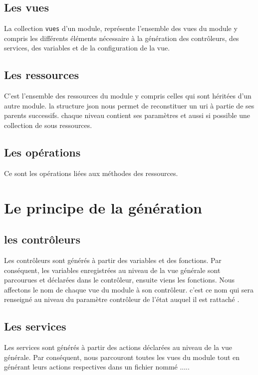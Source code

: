 \documentclass[a4paper,11pt]{report}
\begin{document}
\subsection{Les vues}
La collection {\tt vues} d'un module, représente l'ensemble des vues du module
y compris les différents éléments nécessaire à la génération des contrôleurs,
des services, des variables et de la configuration de la vue. 


\subsection{Les ressources}

C'est l'ensemble des ressources du module y compris celles qui sont héritées 
d'un autre module. la structure json nous permet de reconstituer un uri à
partie de ses parents successifs. chaque niveau contient ses paramètres et 
aussi si possible une collection de sous ressources.

\subsection{Les opérations}

Ce sont les opérations liées aux méthodes des ressources. 


\section{Le principe de la génération}



\subsection{les contrôleurs}

Les contrôleurs sont générés à partir des variables et des fonctions. Par conséquent,
les variables enregistrées au niveau de la vue générale sont parcourues et déclarées 
dans le contrôleur, ensuite viens les fonctions. Nous affectons le nom de chaque vue
du module à son contrôleur. c'est ce nom qui sera renseigné au niveau du paramètre 
\og contrôleur de l'état auquel il est rattaché \fg.

\subsection{Les services}

Les services sont générés à partir des actions déclarées au niveau de la vue 
générale. Par conséquent, nous parcouront toutes les vues du module tout en générant 
leurs actions respectives dans un fichier nommé .....
\end{document}
